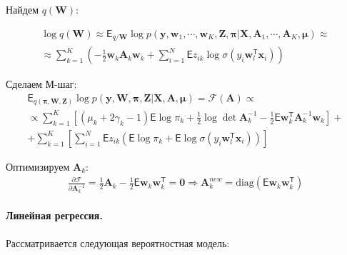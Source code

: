 \documentclass[12pt, twoside]{article}
\numberwithin{equation}{section}
\begin{document}
Найдем $q\left(\textbf{W}\right)$:

\begin{equation}
\label{eq:st:10}
\begin{aligned}
\log q\left(\textbf{W}\right) \approx \mathsf{E}_{q/\textbf{W}}\log{p\left(\textbf{y}, \textbf{w}_1, \cdots, \textbf{w}_K, \textbf{Z}, \bm{\pi}|\textbf{X}, \textbf{A}_1, \cdots, \textbf{A}_K, \bm{\mu}\right)} \approx \\
\approx \sum_{k=1}^{K}\left(-\frac{1}{2}\textbf{w}_{k}\textbf{A}_k\textbf{w}_{k} + \sum_{i=1}^{N}\mathsf{E}z_{ik}\log{\sigma\left(y_i\textbf{w}_{l}^{\mathsf{T}}\textbf{x}_{i}\right)}\right)
\end{aligned}
\end{equation}

Сделаем М-шаг:
\begin{equation}
\label{eq:st:25}
\begin{aligned}
\mathsf{E}_{q(\bm{\pi}, \textbf{W}, \textbf{Z})} \log p(\textbf{y}, \textbf{W}, \bm{\pi}, \textbf{Z}|\textbf{X}, \textbf{A}, \bm{\mu}) = \mathcal{F}(\textbf{A}) \propto \\
 \propto\sum_{k=1}^{K}\left[ \left(\mu_k+2\gamma_k - 1\right)\mathsf{E}\log\pi_k +\frac{1}{2}\log\det\textbf{A}_k^{-1} -\frac{1}{2}\mathsf{E}\textbf{w}_k^{\mathsf{T}}\textbf{A}_{k}^{-1}\textbf{w}_k\right] + \\
+ \sum_{k=1}^{K}\left[ \sum_{i=1}^{N}\mathsf{E}z_{ik}\left(\mathsf{E}\log\pi_k + \mathsf{E} \log\sigma\left(y_i\textbf{w}_{l}^{\mathsf{T}}\textbf{x}_{i}\right)\right)\right]
\end{aligned}
\end{equation}

Оптимизируем $\textbf{A}_k$:
\begin{equation}
\label{eq:st:26}
\begin{aligned}
\frac{\partial\mathcal{F}}{\partial\textbf{A}_k^{-1}} = \frac{1}{2}\textbf{A}_k -\frac{1}{2}\mathsf{E}\textbf{w}_k\textbf{w}_k^{\mathsf{T}} = \textbf{0}\Rightarrow \textbf{A}_k^{new} = \text{diag}(\mathsf{E}\textbf{w}_k\textbf{w}_k^{\mathsf{T}})
\end{aligned}
\end{equation}

\paragraph{Линейная регрессия.}  Рассматривается следующая вероятностная модель:
\end{document}
